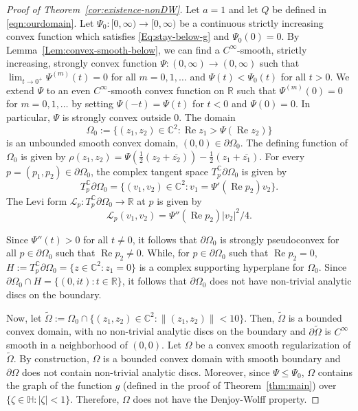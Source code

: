 \documentclass[12pt]{amsart}
\theoremstyle{definition}
\theoremstyle{remark}
\numberwithin{equation}{section}
\def\C{\mathbb C}
\def\Ha{\mathbb H}
\def\R{\mathbb R}
\renewcommand{\Re}{\operatorname{Re}}
\begin{document}
\begin{proof}[Proof of Theorem~\ref{cor:existence-nonDW}]
Let $a=1$ and let $Q$ be defined in \eqref{eqn:ourdomain}. Let $\Psi_0:[0,\infty)\to  [0,\infty)$ be a continuous strictly increasing convex function which satisfies \eqref{Eq:stay-below-g} and $\Psi_0(0)=0$. {By Lemma~\ref{Lem:convex-smooth-below}, we can find a $C^\infty$-smooth, strictly increasing, strongly  convex function $\Psi:(0,\infty)\to (0,\infty)$ such that $\lim_{t\to 0^+}\Psi^{(m)}(t)=0$ for all $m=0,1,\ldots$ and $\Psi(t)<\Psi_0(t)$ for all $t>0$. We extend $\Psi$ to an even $C^\infty$-smooth convex function on $\R$ such that $\Psi^{(m)}(0)=0$ for $m=0,1,\ldots$ by setting $\Psi(-t)=\Psi(t)$ for $t<0$ and $\Psi(0)=0$.} In particular, $\Psi$ is strongly convex outside $0$. The domain
\[
\Omega_0:=\{(z_1,z_2)\in\C^2: \Re z_1 > \Psi(\Re z_2)\}
\]
is an unbounded smooth convex domain,  $(0,0)\in \partial\Omega_0$. The defining function of $\Omega_0$ is given by $\rho(z_1,z_2)=\Psi(\frac{1}{2}(z_2+\overline{z_2}))-\frac{1}{2}(z_1+\overline{z_1})$. For every $p=(p_1,p_2)\in \partial \Omega_0$, the complex tangent space $T_p^\C \partial \Omega_0$ is given by
\[
T_p^\C \partial \Omega_0=\{(v_1,v_2)\in \C^2: v_1=\Psi'(\Re p_2)v_2\}.
\]
The Levi form $\mathcal L_p: T_p^\C \partial \Omega_0\to \R$ at $p$ is given by 
\[
\mathcal L_p(v_1,v_2)=\Psi''(\Re p_2) |v_2|^2/4.
\]
 
Since $\Psi''(t)>0$ for all $t\neq 0$, it follows that  $\partial \Omega_0$ is {strongly pseudoconvex} for all $p\in \partial \Omega_0$ such that $\Re p_2\neq 0$. While, for $p\in \partial \Omega_0$ such that $\Re p_2=0$,  $H:=T_p^\C\partial\Omega_0=\{z\in \C^2: z_1=0\}$ is a complex supporting hyperplane for $\Omega_0$. Since  $\partial \Omega_0\cap H=\{(0,it): t\in\R\}$, it follows that  $\partial\Omega_0$ does not have non-trivial analytic discs on the boundary. 

Now, let $\tilde\Omega:=\Omega_0\cap \{(z_1,z_2)\in \C^2: \|(z_1,z_2)\|<10\}$. Then, $\tilde\Omega$ is a bounded convex domain, with no non-trivial analytic discs on the boundary and $\partial\tilde\Omega$ is $C^\infty$ smooth in a neighborhood of $(0,0)$. Let $\Omega$ be a convex smooth regularization of $\tilde\Omega$. By construction, $\Omega$ is a bounded convex domain with smooth boundary and $\partial \Omega$ does not contain non-trivial analytic discs. Moreover, since $\Psi\leq \Psi_0$, $\Omega$ contains the graph of the function $g$ (defined in the proof of Theorem~\ref{thm:main}) over $\{\zeta\in \Ha: |\zeta|<1\}$. Therefore, $\Omega$ does not have the Denjoy-Wolff property. 
\end{proof}
\end{document}
